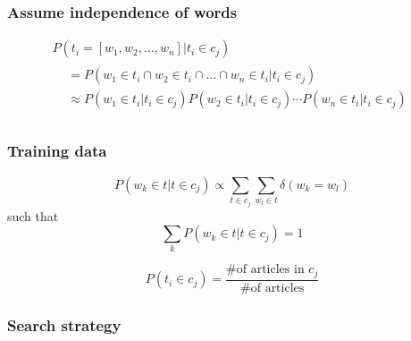 \documentclass{beamer}
\begin{document}
\begin{frame}
\frametitle{Assume independence of words}

\begin{multline*}
P(t_i = [w_1, w_2, \dots, w_n] | t_i \in c_j) \\
\begin{aligned}
& = P(w_1 \in t_i \cap w_2 \in t_i \cap \dots \cap w_n \in t_i | t_i \in c_j) \\
& \approx P(w_1 \in t_i | t_i \in c_j) P(w_2 \in t_i | t_i \in c_j) \cdots P(w_n
\in t_i | t_i \in c_j) \\
\end{aligned}
\end{multline*}

\end{frame}

\begin{frame}
\frametitle{Training data}

\[P(w_k \in t | t \in c_j) \propto \displaystyle \sum_{t \in c_j} \sum_{w_l \in t}
    \delta (w_k = w_l)\]
such that
\[\displaystyle \sum_k P(w_k \in t | t \in c_j) = 1\]

\vspace{2em}

\[P(t_i \in c_j) = \frac{\text{\# of articles in } c_j}{\text{\# of articles}}\]

\end{frame}


\begin{frame}
\frametitle{Search strategy}


\end{frame}
\end{document}
